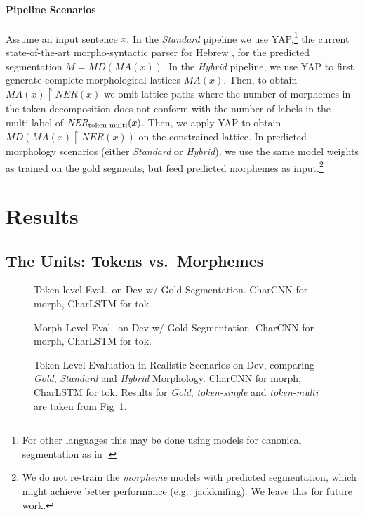\documentclass[11pt,a4paper]{article}
\newcommand{\TOKMACRO}{{\em token-single}\xspace}
\newcommand{\MULMACRO}{{\em token-multi}\xspace}
\newcommand{\MORMACRO}{{\em morpheme}\xspace}
\newcommand{\FLIPMACRO}{{\em Hybrid}\xspace}
\newcommand{\YAPMACRO}{{\em Standard}\xspace}
\begin{document}
\paragraph{Pipeline Scenarios}
Assume an input sentence \(x\). In the \YAPMACRO
pipeline we use YAP,\footnote{For other languages this may be done using  models for canonical segmentation 
as in \cite{kann-etal-2016-neural}.} the current state-of-the-art morpho-syntactic  parser for  Hebrew \cite{more-etal-2019-joint}, for the predicted segmentation  \(M=MD(MA(x))\). 
In the \FLIPMACRO pipeline, we use YAP to first generate complete morphological lattices  
\(MA(x)\). Then, to obtain \(MA(x)\restriction NER(x)\) we omit lattice paths where the number of morphemes in the token decomposition  does not conform with the number of labels in the multi-label  of \(\textit{NER}_\textit{\MULMACRO}(x)\).
Then, we apply YAP to obtain \(MD(MA(x)\restriction NER(x))\) on the constrained lattice.
In predicted morphology scenarios (either \YAPMACRO or \FLIPMACRO), we use the same model weights  as  trained on the gold segments, but feed predicted morphemes as input.\footnote{We do not re-train the \MORMACRO models with predicted segmentation, which might achieve better performance (e.g.. jackknifing). We leave this for future work.}
     


\section{Results}


\subsection{The Units: Tokens vs.\ Morphemes}
\label{sec:units}


\begin{figure}[t]
  \caption{\label{fig:tok-morph-tokeval} 
  Token-level Eval.\ on Dev w/ Gold Segmentation. CharCNN for morph, CharLSTM for tok.}
\end{figure}
\begin{figure}[t]
  \caption{\label{fig:tok-morph-morpheval}
  Morph-Level Eval.\ on Dev w/ Gold Segmentation. CharCNN for morph, CharLSTM for tok.}
\end{figure}

\begin{figure}[t]
  \caption{\label{fig:realistic-tokeval} 
  Token-Level Evaluation in  Realistic Scenarios on Dev, comparing \emph{Gold}, \YAPMACRO and \FLIPMACRO   Morphology. CharCNN for morph, CharLSTM for tok. Results for {\em Gold}, \TOKMACRO and \MULMACRO are taken from Fig~\ref{fig:tok-morph-tokeval}. }
\end{figure}
\end{document}
